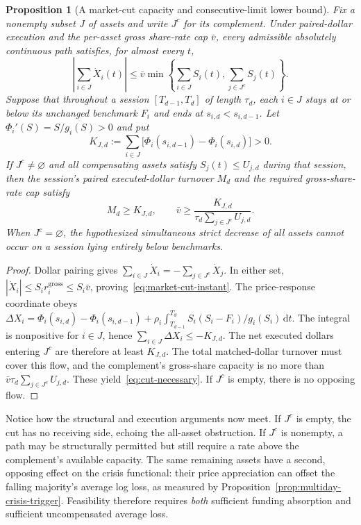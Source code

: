 \documentclass[11pt]{article}
\numberwithin{equation}{section}
\newtheorem{proposition}[theorem]{Proposition}
\theoremstyle{definition}
\theoremstyle{remark}
\newcommand{\dd}{\,\mathrm{d}}
\begin{document}
\begin{proposition}[A market-cut capacity and consecutive-limit lower bound]\label{prop:market-cut}
Fix a nonempty subset $J$ of assets and write $J^c$ for its complement. Under paired-dollar execution and the per-asset gross share-rate cap $\bar v$, every admissible absolutely continuous path satisfies, for almost every $t$,
\begin{equation}\label{eq:market-cut-instant}
\boxed{\left|\sum_{i\in J}\dot X_i(t)\right|\le
\bar v\min\left\{\sum_{i\in J} S_i(t),\sum_{j\in J^c}S_j(t)\right\}.}
\end{equation}
Suppose that throughout a session $[T_{d-1},T_d]$ of length $\tau_d$, each $i\in J$ stays at or below its unchanged benchmark $F_i$ and ends at $s_{i,d}<s_{i,d-1}$. Let $\Phi_i'(S)=S/g_i(S)>0$ and put
\begin{equation}\label{eq:cut-required}
K_{J,d}:=\sum_{i\in J}\big[\Phi_i(s_{i,d-1})-\Phi_i(s_{i,d})\big]>0.
\end{equation}
If $J^c\ne\varnothing$ and all compensating assets satisfy $S_j(t)\le U_{j,d}$ during that session, then the session's paired executed-dollar turnover $M_d$ and the required gross-share-rate cap satisfy
\begin{equation}\label{eq:cut-necessary}
\boxed{M_d\ge K_{J,d},\qquad
\bar v\ge\frac{K_{J,d}}{\tau_d\sum_{j\in J^c}U_{j,d}}.}
\end{equation}
When $J^c=\varnothing$, the hypothesized simultaneous strict decrease of all assets cannot occur on a session lying entirely below benchmarks.
\end{proposition}
\begin{proof}
Dollar pairing gives $\sum_{i\in J}\dot X_i=-\sum_{j\in J^c}\dot X_j$. In either set, $|\dot X_i|\le S_i r_i^{\mathrm{gross}}\le S_i\bar v$, proving~\eqref{eq:market-cut-instant}. The price-response coordinate obeys
$\Delta X_i=\Phi_i(s_{i,d})-\Phi_i(s_{i,d-1})+
\rho_i\int_{T_{d-1}}^{T_d}S_i(S_i-F_i)/g_i(S_i)\dd t$.
The integral is nonpositive for $i\in J$, hence $\sum_{i\in J}\Delta X_i\le-K_{J,d}$. The net executed dollars entering $J^c$ are therefore at least $K_{J,d}$. The total matched-dollar turnover must cover this flow, and the complement's gross-share capacity is no more than $\bar v\tau_d\sum_{j\in J^c}U_{j,d}$. These yield~\eqref{eq:cut-necessary}. If $J^c$ is empty, there is no opposing flow.
\end{proof}
Notice how the structural and execution arguments now meet. If $J^c$ is empty, the cut has no receiving side, echoing the all-asset obstruction. If $J^c$ is nonempty, a path may be structurally permitted but still require a rate above the complement's available capacity. The same remaining assets have a second, opposing effect on the crisis functional: their price appreciation can offset the falling majority's average log loss, as measured by Proposition~\ref{prop:multiday-crisis-trigger}. Feasibility therefore requires \emph{both} sufficient funding absorption and sufficient uncompensated average loss.
\end{document}
